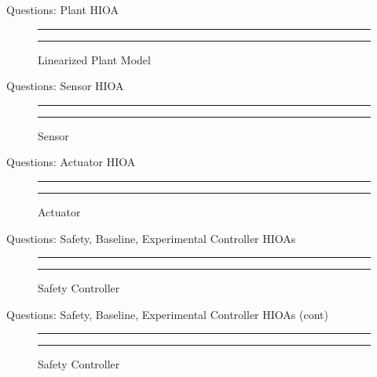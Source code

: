 \documentclass{beamer}
\begin{document}
\begin{frame}{Questions: Plant HIOA}

\begin{figure}[h!]
\centering
  \hrule
  {}
  \hrule
  \caption{Linearized Plant Model}
  \label{fig:plant}
\end{figure}

\end{frame}

\begin{frame}{Questions: Sensor HIOA}

\begin{figure}[h!]
\centering
  \hrule
	{}
  \hrule
  \caption{Sensor}
  \label{fig:sensor}
\end{figure}

\end{frame}

\begin{frame}{Questions: Actuator HIOA}
\begin{figure}[h!]
\centering
  \hrule
	{}
  \hrule
  \caption{Actuator}
  \label{fig:actuator}
\end{figure}
\end{frame}

\begin{frame}{Questions: Safety, Baseline, Experimental Controller HIOAs}

\begin{figure}[h!]
\centering
  \hrule
  {}
  \hrule
  \caption{Safety Controller}
  \label{fig:safetyController}
\end{figure}

\end{frame}

\begin{frame}{Questions: Safety, Baseline, Experimental Controller HIOAs (cont)}

\begin{figure}[h!]
\centering
  \hrule
  {}
  \hrule
  \caption{Safety Controller}
  \label{fig:safetyController}
\end{figure}

\end{frame}
\end{document}

